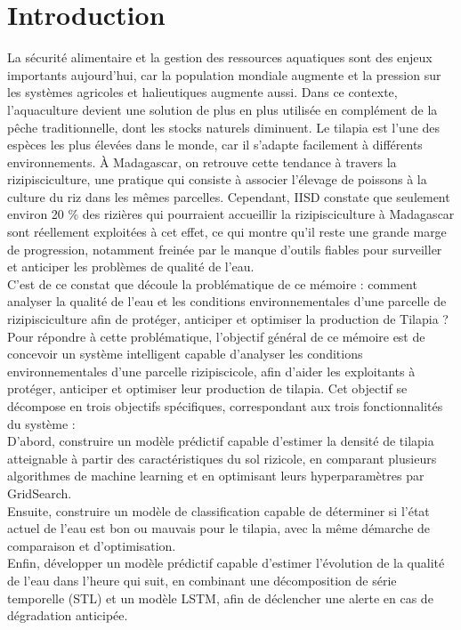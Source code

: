 \documentclass[a4paper,12pt, oneside]{article}
\begin{document}
\vspace*{\fill}
\newpage

\listoftables

\vspace*{\fill}
\newpage

\listoffigures

\vspace*{\fill}
\newpage
{}
\section{Introduction}

La sécurité alimentaire et la gestion des ressources aquatiques sont des enjeux importants aujourd'hui, car la population mondiale augmente et la pression sur les systèmes agricoles et halieutiques augmente aussi. Dans ce contexte, l'aquaculture devient une solution de plus en plus utilisée en complément de la pêche traditionnelle, dont les stocks naturels diminuent. Le tilapia est l'une des espèces les plus élevées dans le monde, car il s'adapte facilement à différents environnements. À Madagascar, on retrouve cette tendance à travers la rizipisciculture, une pratique qui consiste à associer l'élevage de poissons à la culture du riz dans les mêmes parcelles. Cependant, IISD constate que seulement environ 20 \% des rizières qui pourraient accueillir la rizipisciculture à Madagascar sont réellement exploitées à cet effet, ce qui montre qu'il reste une grande marge de progression, notamment freinée par le manque d'outils fiables pour surveiller et anticiper les problèmes de qualité de l'eau.\\

C'est de ce constat que découle la problématique de ce mémoire : comment analyser la qualité de l'eau et les conditions environnementales d'une parcelle de rizipisciculture afin de protéger, anticiper et optimiser la production de Tilapia ?\\

Pour répondre à cette problématique, l'objectif général de ce mémoire est de concevoir un système intelligent capable d'analyser les conditions environnementales d'une parcelle rizipiscicole, afin d'aider les exploitants à protéger, anticiper et optimiser leur production de tilapia. Cet objectif se décompose en trois objectifs spécifiques, correspondant aux trois fonctionnalités du système :\\
D'abord, construire un modèle prédictif capable d'estimer la densité de tilapia atteignable à partir des caractéristiques du sol rizicole, en comparant plusieurs algorithmes de machine learning et en optimisant leurs hyperparamètres par GridSearch.\\
Ensuite, construire un modèle de classification capable de déterminer si l'état actuel de l'eau est bon ou mauvais pour le tilapia, avec la même démarche de comparaison et d'optimisation.\\
Enfin, développer un modèle prédictif capable d'estimer l'évolution de la qualité de l'eau dans l'heure qui suit, en combinant une décomposition de série temporelle (STL) et un modèle LSTM, afin de déclencher une alerte en cas de dégradation anticipée.\\
\end{document}

